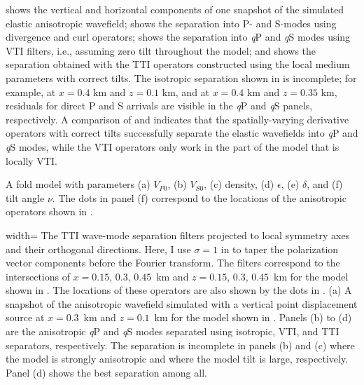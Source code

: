  shows the vertical and horizontal components of one snapshot
of the simulated elastic anisotropic wavefield;  shows the
separation into P- and S-modes using divergence and curl
operators;  shows the separation into {\it q}P and {\it q}S
modes using VTI filters, i.e., assuming zero tilt throughout the
model; and  shows the separation obtained with the TTI
operators constructed using the local medium parameters with correct
tilts. The isotropic separation shown in  is incomplete; for
example, at $x=0.4$ km and $z=0.1$ km, and at $ x=0.4$ km and $z=0.35$
km, residuals for direct P and S arrivals are visible in the {\it q}P
and {\it q}S panels, respectively. A comparison of 
and  indicates that the spatially-varying derivative operators
with correct tilts successfully separate the elastic wavefields into
{\it q}P and {\it q}S modes, while the VTI operators only work in the
part of the model that is locally VTI.

{A fold model with parameters (a) $V_{P0}$, (b) $V_{S0}$, (c) density,
(d) $\epsilon$, (e) $\delta$, and (f) tilt angle $\nu$. The dots in
panel (f) correspond to the locations of the anisotropic operators
shown in .  }


{width=\textwidth} {The TTI wave-mode separation filters projected to
local symmetry axes and their orthogonal directions. Here, I use
$\sigma=1$ in  to taper the polarization vector
components before the Fourier transform. The filters correspond to the
intersections of $x=0.15$, $0.3$, $0.45$~km and $z=0.15$, $0.3$,
$0.45$~km for the model shown
in . The locations of these
operators are also shown by the dots in .}
{(a) A snapshot of the anisotropic wavefield simulated with a vertical
point displacement source at $x=0.3$~km and $z=0.1$~km for the model
shown in {}. Panels (b) to (d)
are the anisotropic {\it q}P and {\it q}S modes separated using
isotropic, VTI, and TTI separators, respectively. The separation is
incomplete in panels (b) and (c) where the model is strongly
anisotropic and where the model tilt is large, respectively. Panel (d)
shows the best separation among all.}


